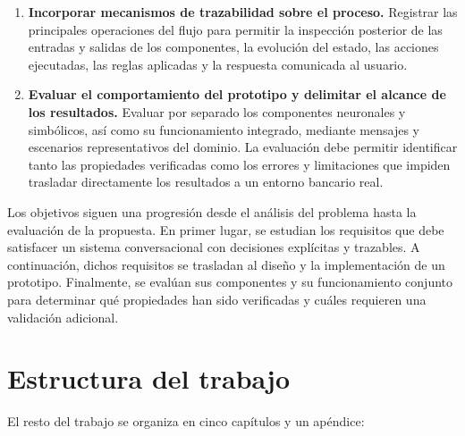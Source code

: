 \documentclass[12pt,a4paper]{report}
\begin{document}
\begin{enumerate}[label=\textbf{OE\arabic*.}, leftmargin=*]
    \item \textbf{Incorporar mecanismos de trazabilidad sobre el proceso.} Registrar las principales operaciones del flujo para permitir la inspección posterior de las entradas y salidas de los componentes, la evolución del estado, las acciones ejecutadas, las reglas aplicadas y la respuesta comunicada al usuario.

    \item \textbf{Evaluar el comportamiento del prototipo y delimitar el alcance de los resultados.} Evaluar por separado los componentes neuronales y simbólicos, así como su funcionamiento integrado, mediante mensajes y escenarios representativos del dominio. La evaluación debe permitir identificar tanto las propiedades verificadas como los errores y limitaciones que impiden trasladar directamente los resultados a un entorno bancario real.
\end{enumerate}

Los objetivos siguen una progresión desde el análisis del problema hasta la evaluación de la propuesta. En primer lugar, se estudian los requisitos que debe satisfacer un sistema conversacional con decisiones explícitas y trazables. A continuación, dichos requisitos se trasladan al diseño y la implementación de un prototipo. Finalmente, se evalúan sus componentes y su funcionamiento conjunto para determinar qué propiedades han sido verificadas y cuáles requieren una validación adicional.

\section{Estructura del trabajo}

El resto del trabajo se organiza en cinco capítulos y un apéndice:
\end{document}
